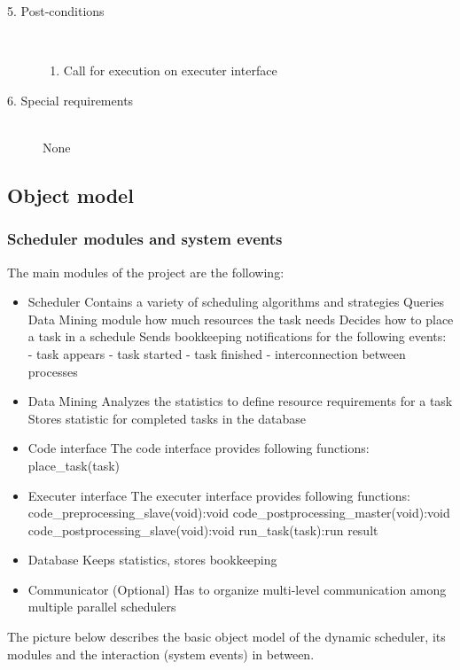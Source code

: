 \begin{description}
\item [5. Post-conditions]\hfill \\
\vspace{-6.5mm}
\begin{enumerate}
\item Call for execution on executer interface
\end{enumerate}

\item [6. Special requirements]\hfill \\
\vspace{-6.5mm}
None

\end{description}

\newpage


\newpage
\subsection{Object model}

\vspace{0.5cm}
\subsubsection{Scheduler modules and system events}
\vspace{0.5cm}
The main modules of the project are the following:
\begin{itemize}
	\item Scheduler
		\subitem Contains a variety of scheduling algorithms and strategies
		\subitem Queries Data Mining module how much resources the task needs
		\subitem Decides how to place a task in a schedule
		\subitem Sends bookkeeping notifications for the following events:
			\subsubitem - task appears
			\subsubitem - task started
			\subsubitem - task finished
			\subsubitem - interconnection between processes
	\item Data Mining
		\subitem Analyzes the statistics to define resource requirements for a task
		\subitem Stores statistic for completed tasks in the database
	
	\item Code interface
		\subitem The code interface provides following functions:
			\subsubitem place\_task(task)
			
	\item Executer interface
		\subitem The executer interface provides following functions:
			\subsubitem code\_preprocessing\_slave(void):void
			\subsubitem code\_postprocessing\_master(void):void
			\subsubitem code\_postprocessing\_slave(void):void
			\subsubitem run\_task(task):run result
	
	\item Database
		\subitem Keeps statistics, stores bookkeeping
		
	\item Communicator (Optional)
		\subitem Has to organize multi-level communication among multiple parallel schedulers
\end{itemize}
\vspace{1cm}
The picture below describes the basic object model of the dynamic scheduler, its modules and the interaction (system events) in between.

